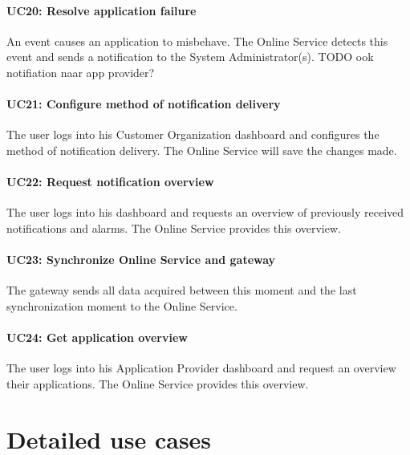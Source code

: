 \documentclass[english,peerreview]{sareport}
\begin{document}
\paragraph{UC20: Resolve application failure}
An event causes an application to misbehave. The Online Service detects this event and sends a notification to the System Administrator(s). TODO ook notifiation naar app provider?

\paragraph{UC21: Configure method of notification delivery}
The user logs into his Customer Organization dashboard and configures the method of notification delivery. The Online Service will save the changes made.

\paragraph{UC22: Request notification overview}
The user logs into his dashboard and requests an overview of previously received notifications and alarms. The Online Service provides this overview.

\paragraph{UC23: Synchronize Online Service and gateway}
The gateway sends all data acquired between this moment and the last synchronization moment to the Online Service.

\paragraph{UC24: Get application overview}
The user logs into his Application Provider dashboard and request an overview their applications. The Online Service provides this overview.



\section{Detailed use cases}
\end{document}
